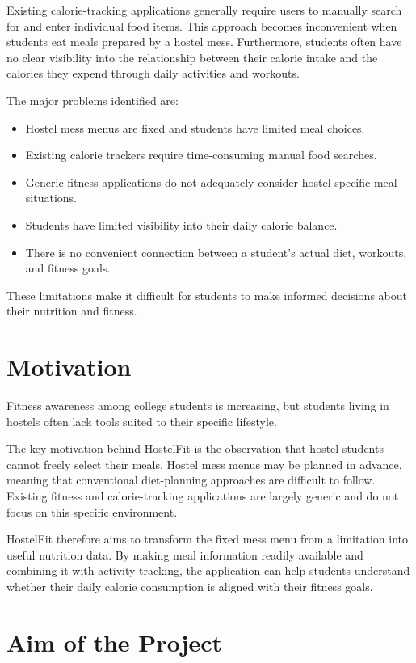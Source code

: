\documentclass[11pt,a4paper]{article}
\begin{document}
Existing calorie-tracking applications generally require users to manually search for and enter individual food items. This approach becomes inconvenient when students eat meals prepared by a hostel mess. Furthermore, students often have no clear visibility into the relationship between their calorie intake and the calories they expend through daily activities and workouts.

The major problems identified are:
\begin{itemize}
    \item Hostel mess menus are fixed and students have limited meal choices.
    \item Existing calorie trackers require time-consuming manual food searches.
    \item Generic fitness applications do not adequately consider hostel-specific meal situations.
    \item Students have limited visibility into their daily calorie balance.
    \item There is no convenient connection between a student's actual diet, workouts, and fitness goals.
\end{itemize}

These limitations make it difficult for students to make informed decisions about their nutrition and fitness.

\section{Motivation}

Fitness awareness among college students is increasing, but students living in hostels often lack tools suited to their specific lifestyle.

The key motivation behind HostelFit is the observation that hostel students cannot freely select their meals. Hostel mess menus may be planned in advance, meaning that conventional diet-planning approaches are difficult to follow. Existing fitness and calorie-tracking applications are largely generic and do not focus on this specific environment.

HostelFit therefore aims to transform the fixed mess menu from a limitation into useful nutrition data. By making meal information readily available and combining it with activity tracking, the application can help students understand whether their daily calorie consumption is aligned with their fitness goals.

\section{Aim of the Project}
\end{document}

